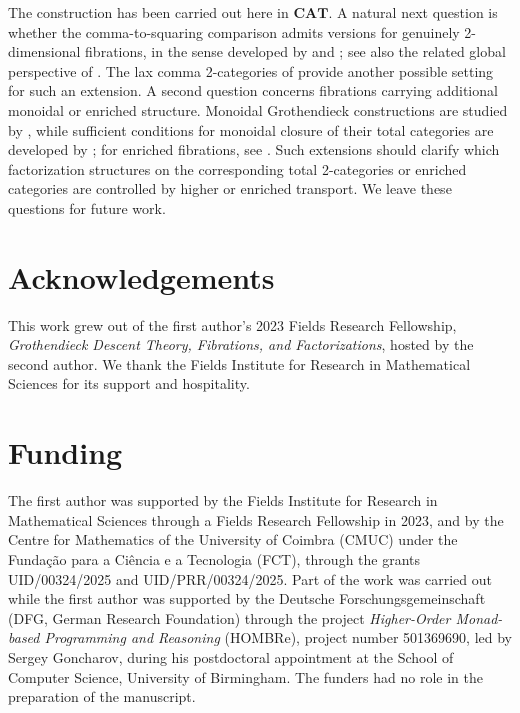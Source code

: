 \documentclass[11pt]{article}
\theoremstyle{plain}
\theoremstyle{definition}
\theoremstyle{remark}
\newcommand{\CAT}{\mathbf{CAT}}
\numberwithin{equation}{section}
\begin{document}
The construction has been carried out here in $\CAT$.  A natural next
question is whether the comma-to-squaring comparison admits versions
for genuinely 2-dimensional fibrations, in the sense developed by
\citet{Hermida1999} and \citet{Buckley2014}; see also the related global
perspective of \citet[Section~9]{PeschkeTholen2020}.  The lax comma
2-categories of \citet{ClementinoLucatelliNunes2024} provide another
possible setting for such an extension.  A second question
concerns fibrations carrying additional monoidal or enriched structure.
Monoidal Grothendieck constructions are studied by
\citet{MoellerVasilakopoulou2020}, while sufficient conditions for
monoidal closure of their total categories are developed by
\citet{LucatelliNunesVakar2025}; for enriched fibrations, see
\citet{Vasilakopoulou2018}.  Such extensions should clarify which
factorization structures on the corresponding total 2-categories or
enriched categories are controlled by higher or enriched transport.
We leave these questions for future work.

\section*{Acknowledgements}
This work grew out of the first author's 2023 Fields Research
Fellowship, \emph{Grothendieck Descent Theory, Fibrations, and
Factorizations}, hosted by the second author.  We thank the Fields
Institute for Research in Mathematical Sciences for its support and
hospitality.


\section*{Funding}
The first author was supported by the Fields
Institute for Research in Mathematical Sciences through a Fields
Research Fellowship in 2023, and by the Centre for Mathematics of the
University of Coimbra (CMUC) under the Funda\c{c}\~ao para a Ci\^encia
e a Tecnologia (FCT), through the grants UID/00324/2025 and
UID/PRR/00324/2025.  Part of the work was carried out while the first
author was supported by the Deutsche Forschungsgemeinschaft (DFG,
German Research Foundation) through the project \emph{Higher-Order
Monad-based Programming and Reasoning} (HOMBRe), project number
501369690, led by Sergey Goncharov, during his postdoctoral appointment
at the School of Computer Science, University of Birmingham.
The funders had no role in the preparation of the manuscript.



\end{document}
